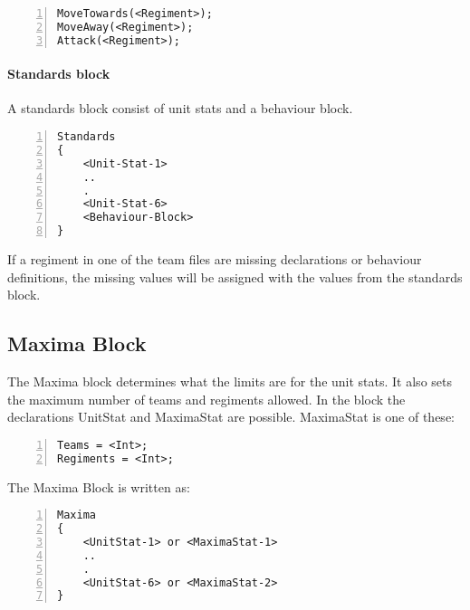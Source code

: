 		\begin{lstlisting}[basicstyle=\small\sffamily,
		keywordstyle={\color{blue}},
		comment={[l]{//}}, morecomment={[s]{/*}{*/}}, commentstyle=\itshape,
		columns={[l]flexible}, numbers=left, numberstyle=\tiny,
		frameround=fftt, frame=shadowbox, captionpos=b,
		caption={Unit functions}]
MoveTowards(<Regiment>);
MoveAway(<Regiment>);
Attack(<Regiment>);
			\end{lstlisting}
	\paragraph{Standards block}
		A standards block consist of unit stats and a behaviour block. 

		\begin{lstlisting}[basicstyle=\small\sffamily,
		keywordstyle={\color{blue}},
		comment={[l]{//}}, morecomment={[s]{/*}{*/}}, commentstyle=\itshape,
		columns={[l]flexible}, numbers=left, numberstyle=\tiny,
		frameround=fftt, frame=shadowbox, captionpos=b,
		caption={Standards block}]
Standards
{
	<Unit-Stat-1>
	..
	.
	<Unit-Stat-6>
	<Behaviour-Block>
}
		\end{lstlisting}
		If a regiment in one of the team files are missing declarations or behaviour definitions, the missing values will be assigned with the values from the standards block.
	\subsection{Maxima Block}
		The Maxima block determines what the limits are for the unit stats. 
		It also sets the maximum number of teams and regiments allowed.
		In the block the declarations UnitStat and MaximaStat are possible.
		MaximaStat is one of these:

		\begin{lstlisting}[basicstyle=\small\sffamily,
		keywordstyle={\color{blue}},
		comment={[l]{//}}, morecomment={[s]{/*}{*/}}, commentstyle=\itshape,
		columns={[l]flexible}, numbers=left, numberstyle=\tiny,
		frameround=fftt, frame=shadowbox, captionpos=b,
		caption={Maxima block}]
Teams = <Int>;
Regiments = <Int>;
		\end{lstlisting}
		The Maxima Block is written as:

		\begin{lstlisting}[basicstyle=\small\sffamily,
		keywordstyle={\color{blue}},
		comment={[l]{//}}, morecomment={[s]{/*}{*/}}, commentstyle=\itshape,
		columns={[l]flexible}, numbers=left, numberstyle=\tiny,
		frameround=fftt, frame=shadowbox, captionpos=b,
		caption={Maxima stat}]
Maxima
{
	<UnitStat-1> or <MaximaStat-1>
	..
	.
	<UnitStat-6> or <MaximaStat-2>
}
		\end{lstlisting}

